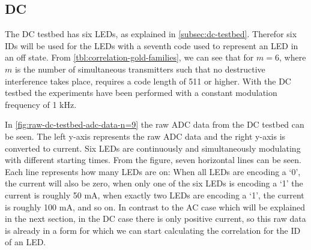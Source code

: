 
\subsection{DC}
\label{subsec:dc-testbed-eval}

The DC testbed has six LEDs, as explained in \autoref{subsec:dc-testbed}.
Therefor six IDs will be used for the LEDs with a seventh code used to represent an LED in an off state.
From \autoref{tbl:correlation-gold-families}, we can see that for $m = 6$, where $m$ is the number of simultaneous transmitters such that no destructive interference takes place, requires a code length of 511 or higher.
With the DC testbed the experiments have been performed with a constant modulation frequency of 1 kHz.

In \autoref{fig:raw-dc-testbed-adc-data-n=9} the raw ADC data from the DC testbed can be seen.
The left y-axis represents the raw ADC data and the right y-axis is converted to current.
Six LEDs are continuously and simultaneously modulating with different starting times.
From the figure, seven horizontal lines can be seen.
Each line represents how many LEDs are on: When all LEDs are encoding a `0', the current will also be zero, when only one of the six LEDs is encoding a `1' the current is roughly 50 mA, when exactly two LEDs are encoding a `1', the current is roughly 100 mA, and so on.
In contrast to the AC case which will be explained in the next section, in the DC case there is only positive current, so this raw data is already in a form for which we can start calculating the correlation for the ID of an LED.

